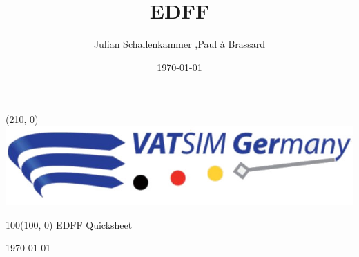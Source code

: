\documentclass[10pt,landscape,a4paper]{article}
\title{EDFF}
\author{Julian Schallenkammer ,Paul à Brassard}
\date{\today}
\begin{document}
\setlength\extrarowheight{1pt}

\setlength{\TPHorizModule}{1mm}
\setlength{\TPVertModule}{\TPHorizModule}
\textblockorigin{7mm}{12mm}

\begin{textblock}{2}(210, 0)
  \includegraphics[width=30\textwidth]{VATGer-Logo-Colour}
\end{textblock}


\begin{textblock}{100}(100, 0)
  \large
  \centering
  EDFF Quicksheet

  \today
\end{textblock}
\end{document}
